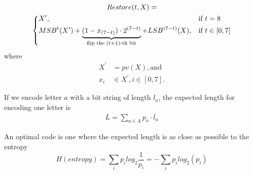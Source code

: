 \begin{multline}
	Restore(t, X) = \\
	\begin{dcases}
		X^\prime, & \text{if } t = 8 \\
		MSB^{t}(X^\prime) + \underbrace{(1 - x_{(7 - t)}) \cdot 2^{(7 - t)}}_{\text{flip the } (t+1) \text{-th bit}} + LSB^{(7 - t)}(X), & \text{if } t \in [0, 7]
	\end{dcases}
\end{multline}
where
\begin{align*}
	X^\prime &= pv(X), \text{and}\\
	x_i &\in X^\prime, i \in [0, 7].
\end{align*}



If we encode letter $a$ with a bit string of length $l_a$, the expected length for
encoding one letter is
\begin{align}
	L = \sum_{a \in A}p_a \cdot l_a
\end{align}

An optimal code is one where the expected length is as close as possible to the entropy
\begin{equation}
	H(entropy) = \sum_i p_i log_2\frac{1}{p_i} = - \sum_i p_i log_2 (p_i )
\end{equation}
